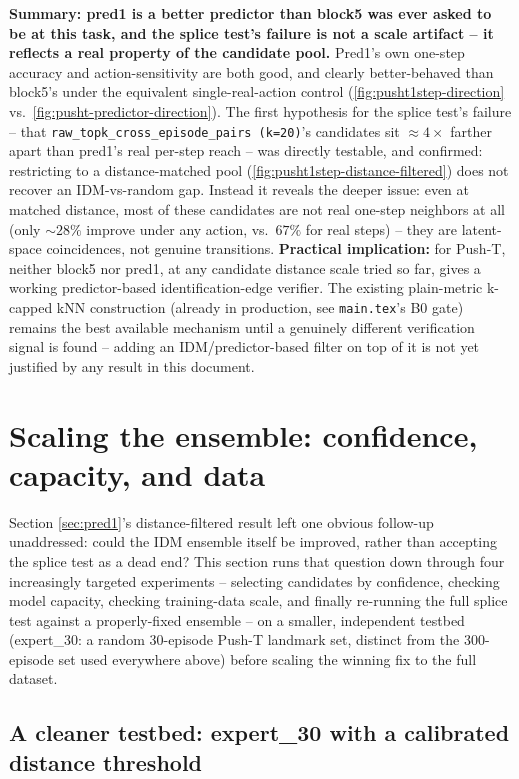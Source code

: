 \documentclass[11pt]{article}
\begin{document}
\textbf{Summary: pred1 is a better predictor than block5 was ever asked to be at this task,
and the splice test's failure is not a scale artifact -- it reflects a real property of the
candidate pool.} Pred1's own one-step accuracy and action-sensitivity are both good, and
clearly better-behaved than block5's under the equivalent single-real-action control
(\cref{fig:pusht1step-direction} vs.\ \cref{fig:pusht-predictor-direction}). The first
hypothesis for the splice test's failure -- that \texttt{raw\_topk\_cross\_episode\_pairs
(k=20)}'s candidates sit $\approx\!4\times$ farther apart than pred1's real per-step reach --
was directly testable, and confirmed: restricting to a distance-matched pool
(\cref{fig:pusht1step-distance-filtered}) does not recover an IDM-vs-random gap. Instead it
reveals the deeper issue: even at matched distance, most of these candidates are not real
one-step neighbors at all (only $\sim\!28\%$ improve under any action, vs.\ $67\%$ for real
steps) -- they are latent-space coincidences, not genuine transitions. \textbf{Practical
implication:} for Push-T, neither block5 nor pred1, at any candidate distance scale tried so
far, gives a working predictor-based identification-edge verifier. The existing plain-metric
k-capped kNN construction (already in production, see \texttt{main.tex}'s B0 gate) remains the
best available mechanism until a genuinely different verification signal is found -- adding an
IDM/predictor-based filter on top of it is not yet justified by any result in this document.

\section{Scaling the ensemble: confidence, capacity, and data}
\label{sec:scaling}

Section \ref{sec:pred1}'s distance-filtered result left one obvious follow-up unaddressed:
could the IDM ensemble itself be improved, rather than accepting the splice test as a dead
end? This section runs that question down through four increasingly targeted experiments --
selecting candidates by confidence, checking model capacity, checking training-data scale,
and finally re-running the full splice test against a properly-fixed ensemble -- on a smaller,
independent testbed (expert\_30: a random 30-episode Push-T landmark set, distinct from the
300-episode set used everywhere above) before scaling the winning fix to the full dataset.

\subsection{A cleaner testbed: expert\_30 with a calibrated distance threshold}
\end{document}
